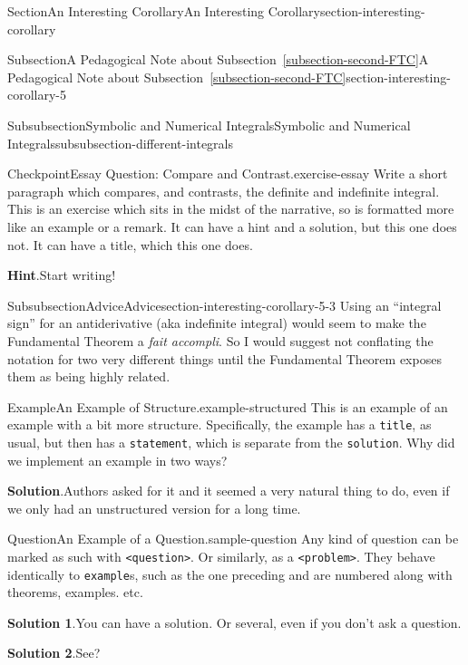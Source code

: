 \documentclass[twoside,10pt,]{article}
\newcommand{\blocktitlefont}{\relax}
\newcommand{\xreffont}{\relax}
\newcommand{\mono}[1]{\texttt{#1}}
\numberwithin{equation}{section}
\begin{document}
\begin{sectionptx}{Section}{An Interesting Corollary}{}{An Interesting Corollary}{}{}{section-interesting-corollary}
\begin{subsectionptx}{Subsection}{A Pedagogical Note about Subsection~{\xreffont\ref*{subsection-second-FTC}}}{}{A Pedagogical Note about Subsection~{\xreffont\ref*{subsection-second-FTC}}}{}{}{section-interesting-corollary-5}
\begin{subsubsectionptx}{Subsubsection}{Symbolic and Numerical Integrals}{}{Symbolic and Numerical Integrals}{}{}{subsubsection-different-integrals}
\begin{inlineexercise}{Checkpoint}{Essay Question: Compare and Contrast.}{exercise-essay}%
Write a short paragraph which compares, and contrasts, the definite and indefinite integral. This is an exercise which sits in the midst of the narrative, so is formatted more like an example or a remark.  It can have a hint and a solution, but this one does not.  It can have a title, which this one does.%
\par\smallskip%
\noindent\textbf{\blocktitlefont Hint}.\hypertarget{exercise-essay-3}{}\quad{}Start writing!%
\end{inlineexercise}%
\end{subsubsectionptx}
%
%
\typeout{************************************************}
\typeout{************************************************}
%
\begin{subsubsectionptx}{Subsubsection}{Advice}{}{Advice}{}{}{section-interesting-corollary-5-3}
Using an ``integral sign'' for an antiderivative (aka indefinite integral) would seem to make the Fundamental Theorem a \textit{fait accompli}.  So I would suggest not conflating the notation for two very different things until the Fundamental Theorem exposes them as being highly related.%
\begin{example}{Example}{An Example of Structure.}{example-structured}%
This is an example of an example with a bit more structure.  Specifically, the example has a \mono{title}, as usual, but then has a \mono{statement}, which is separate from the \mono{solution}.  Why did we implement an example in two ways?%
\par\smallskip%
\noindent\textbf{\blocktitlefont Solution}.\hypertarget{example-structured-3}{}\quad{}Authors asked for it and it seemed a very natural thing to do, even if we only had an unstructured version for a long time.%
\end{example}
\begin{question}{Question}{An Example of a Question.}{sample-question}%
Any kind of question can be marked as such with \mono{<question>}.  Or similarly, as a \mono{<problem>}.  They behave identically to \mono{example}s, such as the one preceding and are numbered along with theorems, examples. etc.%
\par\smallskip%
\noindent\textbf{\blocktitlefont Solution 1}.\hypertarget{sample-question-3}{}\quad{}You can have a solution. Or several, even if you don't ask a question.%
\par\smallskip%
\noindent\textbf{\blocktitlefont Solution 2}.\hypertarget{sample-question-4}{}\quad{}See?%

\end{question}
\end{subsubsectionptx}
\end{subsectionptx}
\end{sectionptx}
\end{document}

